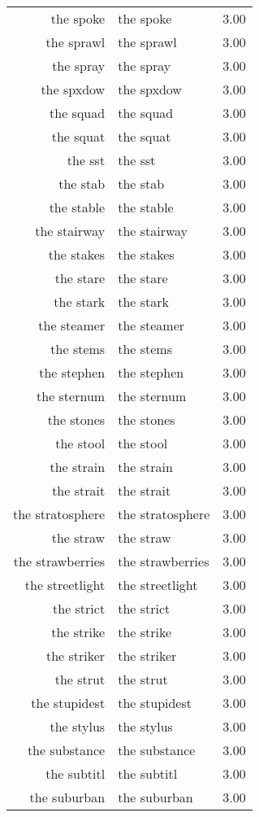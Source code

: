 \begin{table}[ht]
\begin{tabular}{rlr}
  the spoke & the spoke & 3.00 \\ 
  the sprawl & the sprawl & 3.00 \\ 
  the spray & the spray & 3.00 \\ 
  the spxdow & the spxdow & 3.00 \\ 
  the squad & the squad & 3.00 \\ 
  the squat & the squat & 3.00 \\ 
  the sst & the sst & 3.00 \\ 
  the stab & the stab & 3.00 \\ 
  the stable & the stable & 3.00 \\ 
  the stairway & the stairway & 3.00 \\ 
  the stakes & the stakes & 3.00 \\ 
  the stare & the stare & 3.00 \\ 
  the stark & the stark & 3.00 \\ 
  the steamer & the steamer & 3.00 \\ 
  the stems & the stems & 3.00 \\ 
  the stephen & the stephen & 3.00 \\ 
  the sternum & the sternum & 3.00 \\ 
  the stones & the stones & 3.00 \\ 
  the stool & the stool & 3.00 \\ 
  the strain & the strain & 3.00 \\ 
  the strait & the strait & 3.00 \\ 
  the stratosphere & the stratosphere & 3.00 \\ 
  the straw & the straw & 3.00 \\ 
  the strawberries & the strawberries & 3.00 \\ 
  the streetlight & the streetlight & 3.00 \\ 
  the strict & the strict & 3.00 \\ 
  the strike & the strike & 3.00 \\ 
  the striker & the striker & 3.00 \\ 
  the strut & the strut & 3.00 \\ 
  the stupidest & the stupidest & 3.00 \\ 
  the stylus & the stylus & 3.00 \\ 
  the substance & the substance & 3.00 \\ 
  the subtitl & the subtitl & 3.00 \\ 
  the suburban & the suburban & 3.00 \\ 

\end{tabular}
\end{table}
